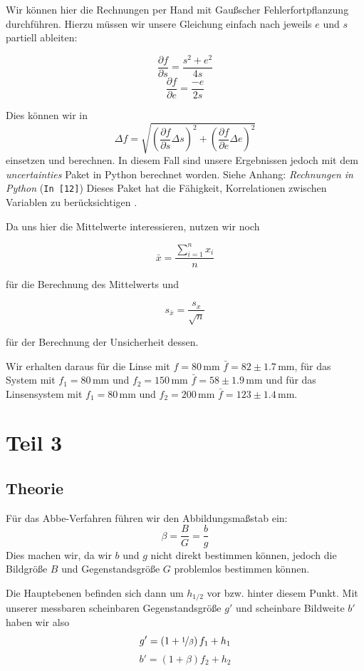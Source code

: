 \documentclass[11pt,a4paper]{article}
\newcommand{\refpy}[1]{Siehe Anhang: \textit{Rechnungen in Python} (\texttt{{\color{incolor}In [{\color{incolor}#1}]}})}
\newcommand\mean{\begin{equation}
\bar{x}=\frac{\sum_{i=1}^n x_{i}}{n}\label{mean}
\end{equation}}
\newcommand\meanstd{\begin{equation}
s_{\bar{x}}=\frac{s_x}{\sqrt{n}}\label{meanstd}
\end{equation}}
\begin{document}
Wir k\"onnen hier die Rechnungen per Hand mit Gau\ss scher Fehlerfortpflanzung durchf\"uhren. Hierzu m\"ussen wir unsere Gleichung einfach nach jeweils $e$ und $s$ partiell ableiten:

\[
\frac{\partial f}{\partial s}=\frac{s^2+e^2}{4s}
\]
\[
\frac{\partial f}{\partial e}=\frac{-e}{2s}
\]

Dies k\"onnen wir in
\[
\Delta f=\sqrt{\left(\frac{\partial f}{\partial s}\Delta s\right)^2+\left(\frac{\partial f}{\partial e}\Delta e\right)^2}
\]
einsetzen und berechnen. In diesem Fall sind unsere Ergebnissen jedoch mit dem \textit{uncertainties} Paket in Python berechnet worden. \refpy{12} Dieses Paket hat die F\"ahigkeit, Korrelationen zwischen Variablen zu ber\"ucksichtigen \cite{Uncertainties}.

Da uns hier die Mittelwerte interessieren, nutzen wir noch

\mean

f\"ur die Berechnung des Mittelwerts und

\meanstd

f\"ur der Berechnung der Unsicherheit dessen.

Wir erhalten daraus f\"ur die Linse mit $f=80\,$mm $\bar{f}=82\pm1.7\,$mm, f\"ur das System mit $f_1=80\,$mm und $f_2=150\,$mm $\bar{f}=58\pm1.9\,$mm und f\"ur das Linsensystem mit $f_1=80\,$mm und $f_2=200\,$mm $\bar{f}=123\pm1.4\,$mm.

\section{Teil 3}

\subsection{Theorie}

F\"ur das Abbe-Verfahren f\"uhren wir den Abbildungsma\ss stab ein:
\begin{equation}
\beta=\frac{B}{G}=\frac{b}{g}\label{eq:4}
\end{equation}
Dies machen wir, da wir $b$ und $g$ nicht direkt bestimmen k\"onnen, jedoch die Bildgr\"o\ss e $B$ und Gegenstandsgr\"o\ss e $G$ problemlos bestimmen k\"onnen.

Die Hauptebenen befinden sich dann um $h_{1/2}$ vor bzw. hinter diesem Punkt. Mit unserer messbaren scheinbaren Gegenstandsgr\"o\ss e $g'$ und scheinbare Bildweite $b'$ haben wir also
\begin{equation}
g'=\left(1+\nicefrac{1}{\beta}\right)f_1+h_1\label{eq:5}
\end{equation}
\begin{equation}
b'=\left(1+\beta\right)f_2+h_2\label{eq:6}
\end{equation}
\end{document}
